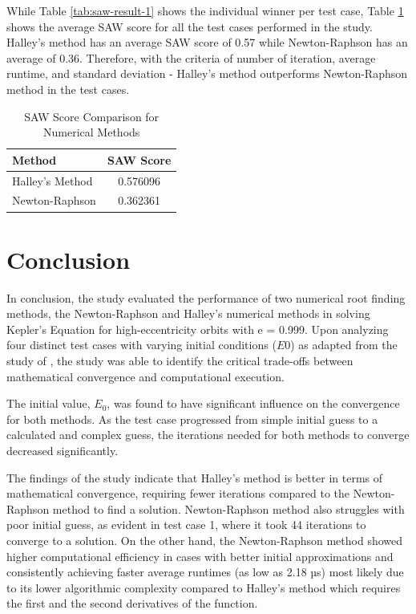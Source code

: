 \documentclass[a4paper,11pt]{article}
\begin{document}
While Table \ref{tab:saw-result-1} shows the individual winner per test case, Table \ref{tab:saw-result-2} shows the average SAW score for all the test cases performed in the study. Halley's method has an average SAW score of 0.57 while Newton-Raphson has an average of 0.36. Therefore, with the criteria of number of iteration, average runtime, and standard deviation - Halley's method outperforms Newton-Raphson method in the test cases.

\begin{table}[H]
    \centering
    \caption{SAW Score Comparison for Numerical Methods}
    \label{tab:saw-result-2}
    \vspace{2mm}
    \begin{tabular}{l c}
        \toprule
        \textbf{Method} & \textbf{SAW Score} \\
        \midrule
        Halley's Method & 0.576096 \\
        Newton-Raphson & 0.362361 \\
        \bottomrule
    \end{tabular}
\end{table}

\section{Conclusion}

In conclusion, the study evaluated the performance of two numerical root finding methods, the Newton-Raphson and Halley's numerical methods in solving Kepler's Equation for high-eccentricity orbits with e = 0.999. Upon analyzing four
 distinct test cases with varying initial conditions ($E0$) as adapted from the study of \textcite{ozuomba2014comparative}, the study was able to identify the critical trade-offs between mathematical convergence and computational execution.

The initial value, $E_0$, was found to have significant influence on the convergence for both methods. As the test case progressed from simple initial guess to a calculated and complex guess, the iterations  needed for both methods to converge decreased significantly.

The findings of the study indicate that Halley's method is better in terms of mathematical convergence, requiring fewer iterations compared to the Newton-Raphson method to find a solution.  Newton-Raphson method also struggles with poor initial guess, as evident in test case 1, where it took 44 iterations to converge to a solution. On the other hand, the Newton-Raphson method showed higher computational efficiency in cases with better initial approximations and consistently achieving faster average runtimes (as low as 2.18 µs) most likely due to its lower algorithmic complexity compared to Halley's method which requires the first and the second derivatives of the function.
\end{document}
